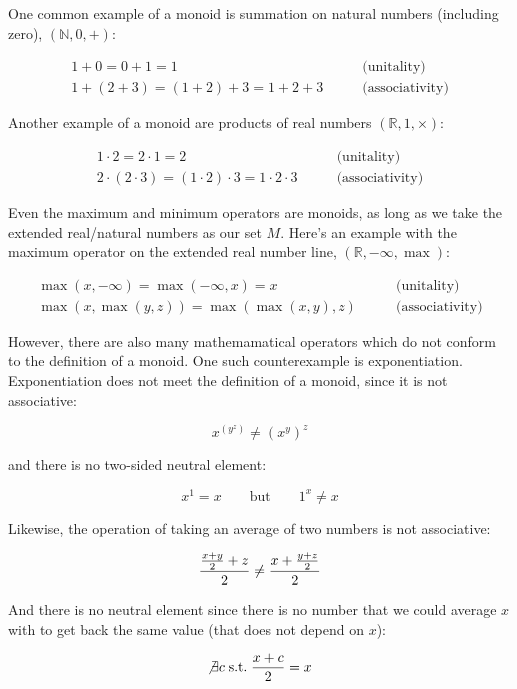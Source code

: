 \documentclass[
  openany]{book}
\theoremstyle{definition}
\theoremstyle{definition}
\theoremstyle{definition}
\theoremstyle{definition}
\theoremstyle{remark}
\begin{document}
One common example of a monoid is summation on natural numbers (including zero), \((\mathbb{N}, 0, +)\):

\begin{align}
1 + 0 = 0 + 1 = 1 & \qquad \text{(unitality)} \\
1 + (2 + 3) = (1 + 2) + 3 = 1 + 2 + 3 & \qquad \text{(associativity)}
\end{align}

Another example of a monoid are products of real numbers \((\mathbb{R}, 1, \times)\):

\begin{align} 
1 \cdot 2 = 2 \cdot 1 = 2 & \qquad \text{(unitality)} \\
2 \cdot (2 \cdot 3) = (1 \cdot 2) \cdot 3 = 1 \cdot 2 \cdot 3 & \qquad \text{(associativity)}
\end{align}

Even the maximum and minimum operators are monoids, as long as we take the extended real/natural numbers as our set \(M\). Here's an example with the maximum operator on the extended real number line, \((\mathbb{R}, -\infty, \max)\):

\begin{align}
\max(x, -\infty) = \max(-\infty, x) = x & \qquad \text{(unitality)} \\
\max(x, \max(y, z)) = \max(\max(x, y), z) & \qquad \text{(associativity)}
\end{align}

However, there are also many mathemamatical operators which do not conform to the definition of a monoid. One such counterexample is exponentiation. Exponentiation does not meet the definition of a monoid, since it is not associative:

\[x^{(y^z)} \neq (x^y)^z\]

and there is no two-sided neutral element:

\[x^1 = x \qquad \text{but} \qquad 1^x \neq x\]

Likewise, the operation of taking an average of two numbers is not associative:

\[\frac{\frac{x + y}{2} + z}{2} \neq \frac{x + \frac{y + z}{2}}{2} \\\]

And there is no neutral element since there is no number that we could average \(x\) with to get back the same value (that does not depend on \(x\)):

\[\not\exists c \; \text{s.t.} \; \frac{x + c}{2} = x\]
\end{document}
